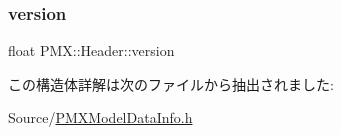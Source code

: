 \mbox{\label{struct_p_m_x_1_1_header_ab31b5e1992e6a57db7617286fdeec3b2}} 
\subsubsection{\texorpdfstring{version}{version}}
{\footnotesize\ttfamily float P\+M\+X\+::\+Header\+::version}



この構造体詳解は次のファイルから抽出されました\+:\begin{DoxyCompactItemize}
\item 
Source/\mbox{\hyperlink{_p_m_x_model_data_info_8h}{P\+M\+X\+Model\+Data\+Info.\+h}}\end{DoxyCompactItemize}
